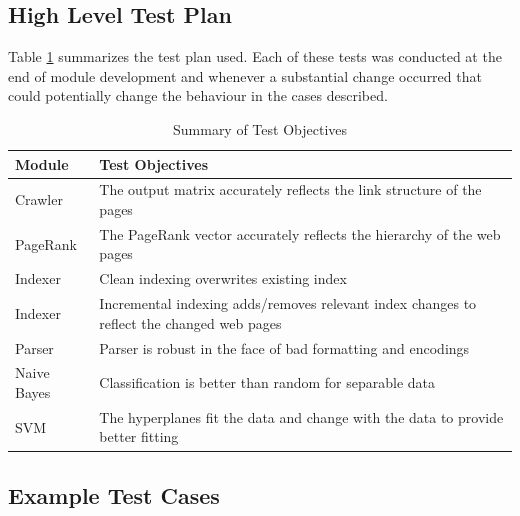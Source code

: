 \documentclass[12pt,notitlepage,twoside]{scrbook}
\begin{document}
\subsection{High Level Test Plan}
Table \ref{tab:test} summarizes the test plan used. Each of these tests
was conducted at the end of module development and whenever a substantial change occurred
that could potentially change the behaviour in the cases described.
\begin{table}[h!]
	\begin{tabular}[h!]{l p{12cm}}
	\textbf{Module} & \textbf{Test Objectives}\\ \hline
Crawler & The output matrix accurately reflects the link structure of the pages \\
PageRank & The PageRank vector accurately reflects the hierarchy of the web pages \\
Indexer & Clean indexing overwrites existing index \\
Indexer & Incremental indexing adds/removes relevant index changes to reflect the changed
web pages \\
Parser & Parser is robust in the face of bad formatting and encodings \\
Naive Bayes & Classification is better than random for separable data \\
SVM & The hyperplanes fit the data and change with the data to provide better fitting 
\end{tabular}
\caption{Summary of Test Objectives\label{tab:test}}
\end{table}
\subsection{Example Test Cases}
\end{document}
